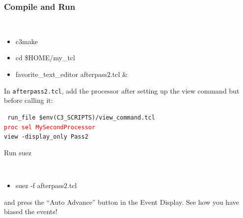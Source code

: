\documentclass[12pt,compress]{beamer}
\begin{document}
\begin{frame}
\frametitle{Compile and Run}

{\tt \scriptsize
\begin{itemize}
\item c3make
\item cd \$HOME/my\_tcl
\item favorite\_text\_editor afterpass2.tcl \&
\end{itemize}}

\vfill In {\tt afterpass2.tcl}, add the processor after setting up the
view command but before calling it:

\vspace{0.25 cm}
\hspace{0.5 cm} \begin{minipage}{0.9\linewidth}
\tt \scriptsize
run\_file \$env(C3\_SCRIPTS)/view\_command.tcl \\
\textcolor{red}{proc sel MySecondProcessor} \\
view -display\_only Pass2
\end{minipage}

\vfill
Run suez
{\tt \scriptsize
\begin{itemize}
\item suez -f afterpass2.tcl
\end{itemize}}
and press the ``Auto Advance'' button in the Event Display.  See how you have biased the events!

\end{frame}
\end{document}

